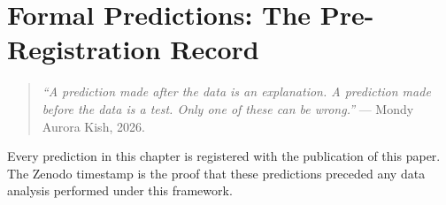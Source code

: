 \documentclass[11pt, letterpaper, openany]{book}
\begin{document}
\clearpage
\chapter{Formal Predictions: The Pre-Registration Record}

\begin{quote}
\textit{``A prediction made after the data is an explanation.
A prediction made before the data is a test. Only one of these
can be wrong.''} --- Mondy Aurora Kish, 2026.
\end{quote}

Every prediction in this chapter is registered with the publication of
this paper. The Zenodo timestamp is the proof that these predictions
preceded any data analysis performed under this framework.
\end{document}
